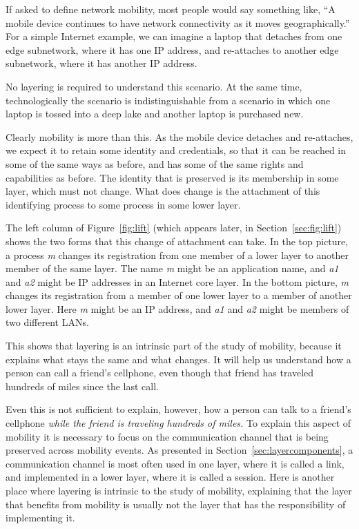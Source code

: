 If asked to define network mobility, most people would say something
like, ``A mobile device continues to have network connectivity as it
moves geographically.''
For a simple Internet example, we can imagine a laptop that detaches
from one edge subnetwork, where it has one IP address, and re-attaches
to another edge subnetwork, where it has another IP address.

No layering is required to understand this scenario.
At the same time, technologically
the scenario is indistinguishable from a scenario
in which one laptop is tossed into a deep lake and another 
laptop is purchased new.

Clearly mobility is more than this.
As the mobile device detaches and re-attaches, we expect it to retain some
identity and credentials, so that it can be reached in some of the
same ways as
before, and has some of the same rights and capabilities as before.
The identity that is preserved is its membership in some layer, which
must not change.
What does change
is the attachment of this identifying
process to some process in some lower layer.

The left column of Figure~\ref{fig:lift} (which appears later, in 
Section~\ref{sec:fig:lift}) shows the two forms that
this change of attachment can take.
In the top picture, a process {\it m} changes its registration from
one member of a lower layer to another member of the same layer.
The name {\it m} might be an application name, and {\it a1} and {\it a2}
might be IP addresses in an Internet core layer.
In the bottom picture, {\it m} changes its registration from
a member of one lower layer to a member of another lower layer.
Here {\it m} might be an IP address, and {\it a1} and {\it a2}
might be members of two different LANs.

This shows that layering is an intrinsic part of the study of
mobility, because it explains
what stays the same and what changes.
It will help us understand how a person can
call a friend's cellphone, even
though that friend has traveled hundreds of miles since the last call.

Even this is not sufficient to explain, however, how a person can talk
to a friend's cellphone {\it while the friend is traveling hundreds of
miles.}
To explain this aspect of mobility
it is necessary to focus on the communication channel
that is being preserved across mobility events.
As presented in Section~\ref{sec:layercomponents}, a communication
channel is most often used in one layer, where it is called a link,
and implemented in a lower layer, where it is called a session.
Here is another place where layering is intrinsic to the study of
mobility, explaining that the layer that benefits from mobility is
usually not the layer that has the responsibility of implementing it.

